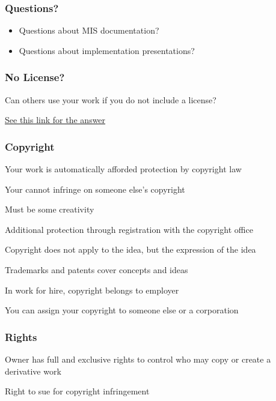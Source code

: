 \documentclass[t,12pt,numbers,fleqn]{beamer}
\begin{document}

\begin{frame}
\frametitle{Questions?}
\begin{itemize}
\item Questions about MIS documentation?
\item Questions about implementation presentations?
\end{itemize}
\end{frame}


\begin{frame}
\frametitle{No License?}

\bi
\item Can others use your work if you do not include a license?
\item \href{http://choosealicense.com/no-license/}{See this link for the answer}
\ei

\end{frame}


\begin{frame}
\frametitle{Copyright}

\bi
\item Your work is automatically afforded protection by copyright law
\bi
\item Your cannot infringe on someone else's copyright
\item Must be some creativity
\ei
\item Additional protection through registration with the copyright office
\item Copyright does not apply to the idea, but the expression of the idea
\item Trademarks and patents cover concepts and ideas
\item In work for hire, copyright belongs to employer
\item You can assign your copyright to someone else or a corporation
\ei

\end{frame}


\begin{frame}
\frametitle{Rights}

\bi
\item Owner has full and exclusive rights to control who may copy or create a
  derivative work
\item Right to sue for copyright infringement
\ei

\end{frame}
\end{document}

